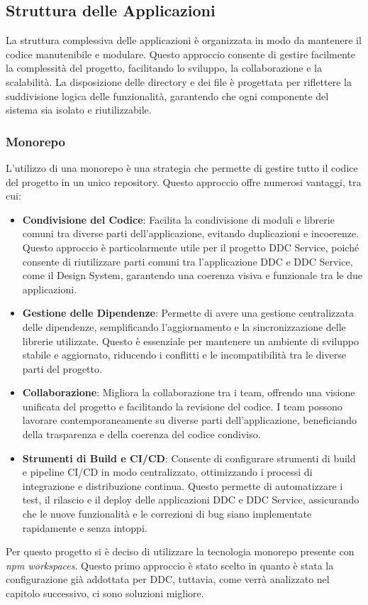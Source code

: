 \subsection{Struttura delle Applicazioni}
\label{subsec:struttura_applicazioni}

La struttura complessiva delle applicazioni è organizzata in modo da mantenere il codice manutenibile e modulare. Questo approccio consente di gestire facilmente la complessità del progetto, facilitando lo sviluppo, la collaborazione e la scalabilità. 
La disposizione delle directory e dei file è progettata per riflettere la suddivisione logica delle funzionalità, garantendo che ogni componente del sistema sia isolato e riutilizzabile.


\subsubsection*{Monorepo}
L'utilizzo di una monorepo è una strategia che permette di gestire tutto il codice del progetto in un unico repository.
Questo approccio offre numerosi vantaggi, tra cui:

\begin{itemize}
    \item \textbf{Condivisione del Codice}: Facilita la condivisione di moduli e librerie comuni tra diverse parti dell'applicazione, evitando duplicazioni e incoerenze.
    Questo approccio è particolarmente utile per il progetto DDC Service, poiché consente di riutilizzare parti comuni tra l'applicazione DDC e DDC Service, come il Design System, garantendo una coerenza visiva e funzionale tra le due applicazioni.
    \item \textbf{Gestione delle Dipendenze}: Permette di avere una gestione centralizzata delle dipendenze, semplificando l'aggiornamento e la sincronizzazione delle librerie utilizzate.
    Questo è essenziale per mantenere un ambiente di sviluppo stabile e aggiornato, riducendo i conflitti e le incompatibilità tra le diverse parti del progetto.
    \item \textbf{Collaborazione}: Migliora la collaborazione tra i team, offrendo una visione unificata del progetto e facilitando la revisione del codice.
    I team possono lavorare contemporaneamente su diverse parti dell'applicazione, beneficiando della trasparenza e della coerenza del codice condiviso.
    \item \textbf{Strumenti di Build e CI/CD}: Consente di configurare strumenti di build e pipeline CI/CD in modo centralizzato, ottimizzando i processi di integrazione e distribuzione continua.
    Questo permette di automatizzare i test, il rilascio e il deploy delle applicazioni DDC e DDC Service, assicurando che le nuove funzionalità e le correzioni di bug siano implementate rapidamente e senza intoppi.
\end{itemize}
Per questo progetto si è deciso di utilizzare la tecnologia monorepo presente con \textit{npm workspaces}.
Questo primo approccio è stato scelto in quanto è stata la configurazione già addottata per DDC, tuttavia, come verrà analizzato nel capitolo successivo, ci sono soluzioni migliore.

